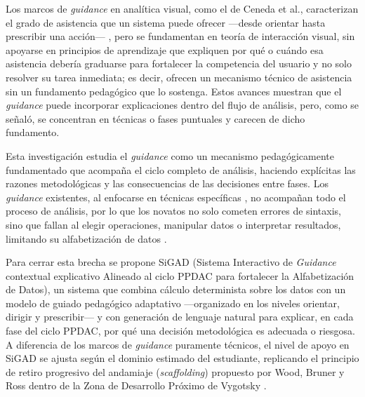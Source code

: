 \documentclass[10pt,journal,compsoc]{IEEEtran}
\begin{document}
Los marcos de \textit{guidance} en analítica visual, como el de Ceneda et
al., caracterizan el grado de asistencia que un sistema puede ofrecer —desde
orientar hasta prescribir una acción— \cite{ceneda2016}, pero se fundamentan
en teoría de interacción visual, sin apoyarse en principios de aprendizaje
que expliquen por qué o cuándo esa asistencia debería graduarse para
fortalecer la competencia del usuario y no solo resolver su tarea inmediata;
es decir, ofrecen un mecanismo técnico de asistencia sin un fundamento
pedagógico que lo sostenga. Estos avances muestran que el \textit{guidance}
puede incorporar explicaciones dentro del flujo de análisis, pero, como se
señaló, se concentran en técnicas o fases puntuales y carecen de dicho
fundamento.

Esta investigación estudia el \textit{guidance} como un mecanismo
pedagógicamente fundamentado que acompaña el ciclo completo de análisis,
haciendo explícitas las razones metodológicas y las consecuencias de las
decisiones entre fases. Los \textit{guidance} existentes, al enfocarse en
técnicas específicas \cite{zhang2024,wang2025}, no acompañan todo el proceso
de análisis, por lo que los novatos no solo cometen errores de sintaxis, sino
que fallan al elegir operaciones, manipular datos o interpretar resultados,
limitando su alfabetización de datos \cite{wolff2016,singh2024,neuwinger2025}.

Para cerrar esta brecha se propone SiGAD (Sistema Interactivo de
\textit{Guidance} contextual explicativo Alineado al ciclo PPDAC para
fortalecer la Alfabetización de Datos), un sistema que combina cálculo
determinista sobre los datos con un modelo de guiado pedagógico
adaptativo —organizado en los niveles orientar, dirigir y prescribir— y con
generación de lenguaje natural para explicar, en cada fase del ciclo PPDAC,
por qué una decisión metodológica es adecuada o riesgosa. A diferencia de los
marcos de \textit{guidance} puramente técnicos, el nivel de apoyo en SiGAD se
ajusta según el dominio estimado del estudiante, replicando el principio de
retiro progresivo del andamiaje (\textit{scaffolding}) propuesto por Wood,
Bruner y Ross \cite{woodbrunerross1976} dentro de la Zona de Desarrollo
Próximo de Vygotsky \cite{vygotsky1978}.
\end{document}

